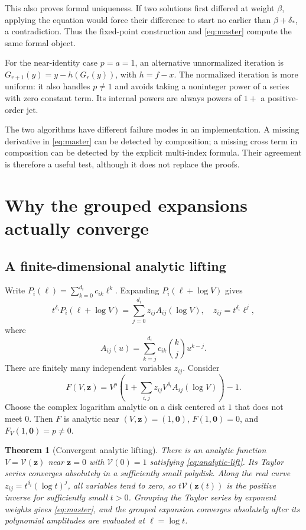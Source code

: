 \documentclass[11pt,a4paper]{article}
\numberwithin{equation}{section}
\newtheorem{theorem}{Theorem}[section]
\theoremstyle{definition}\newtheorem{definition}[theorem]{Definition}
\theoremstyle{remark}\newtheorem{remark}[theorem]{Remark}
\begin{document}
This also proves formal uniqueness. If two solutions first differed at
weight $\beta$, applying the equation would force their difference to
start no earlier than $\beta+\delta_*$, a contradiction. Thus the
fixed-point construction and \cref{eq:master} compute the same formal
object.

For the near-identity case $p=a=1$, an alternative unnormalized iteration
is $G_{r+1}(y)=y-h(G_r(y))$, with $h=f-x$. The normalized iteration is more
uniform: it also handles $p\ne1$ and avoids taking a noninteger power of
a series with zero constant term. Its internal powers are always powers
of $1+$ a positive-order jet.

The two algorithms have different failure modes in an implementation.
A missing derivative in \cref{eq:master} can be detected by composition;
a missing cross term in composition can be detected by the explicit
multi-index formula. Their agreement is therefore a useful test, although
it does not replace the proofs.

\section{Why the grouped expansions actually converge}
\label{sec:convergence}

\subsection{A finite-dimensional analytic lifting}

Write $P_i(\ell)=\sum_{k=0}^{d_i}c_{ik}\ell^k$. Expanding
$P_i(\ell+\log V)$ gives
\begin{equation}
 t^{\delta_i}P_i(\ell+\log V)
 =\sum_{j=0}^{d_i}z_{ij}A_{ij}(\log V),\quad
 z_{ij}=t^{\delta_i}\ell^j,
 \label{eq:lift}
\end{equation}
where
\[
 A_{ij}(u)=\sum_{k=j}^{d_i}c_{ik}\binom kj u^{k-j}.
\]
There are finitely many independent variables $z_{ij}$. Consider
\begin{equation}
 F(V,\bm z)=V^p\left(1+
   \sum_{i,j}z_{ij}V^{\delta_i}A_{ij}(\log V)\right)-1.
 \label{eq:analytic-lift}
\end{equation}
Choose the complex logarithm analytic on a disk centered at $1$ that does
not meet $0$. Then $F$ is analytic near $(V,\bm z)=(1,\bm0)$,
$F(1,\bm0)=0$, and $F_V(1,\bm0)=p\ne0$.

\begin{theorem}[Convergent analytic lifting]
\label{thm:analytic}
There is an analytic function $V=\mathcal V(\bm z)$ near $\bm z=0$ with
$\mathcal V(0)=1$ satisfying \cref{eq:analytic-lift}. Its Taylor series
converges absolutely in a sufficiently small polydisk. Along the real
curve $z_{ij}=t^{\delta_i}(\log t)^j$, all variables tend to zero, so
$t\mathcal V(\bm z(t))$ is the positive inverse for sufficiently small
$t>0$. Grouping the Taylor series by exponent weights gives
\cref{eq:master}, and the grouped expansion converges absolutely after
its polynomial amplitudes are evaluated at $\ell=\log t$.
\end{theorem}
\end{document}
